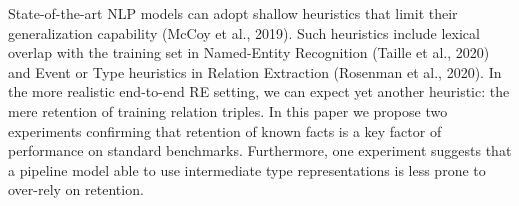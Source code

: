 State-of-the-art NLP models can adopt shallow heuristics that limit their generalization capability (McCoy et al., 2019). Such heuristics include lexical overlap with the training set in Named-Entity Recognition (Taille et al., 2020) and Event or Type heuristics in Relation Extraction (Rosenman et al., 2020). In the more realistic end-to-end RE setting, we can expect yet another heuristic: the mere retention of training relation triples. In this paper we propose two experiments confirming that retention of known facts is a key factor of performance on standard benchmarks. Furthermore, one experiment suggests that a pipeline model able to use intermediate type representations is less prone to over-rely on retention.
